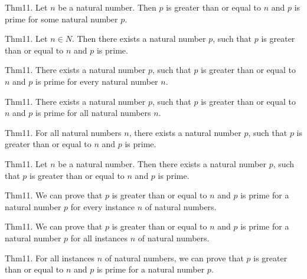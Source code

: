 \documentclass{article}
\begin{document}
Thm11. Let $n$ be a natural number. Then $p$ is greater than or equal to $n$ and $p$ is prime for some natural number $p$.

Thm11. Let $n \in N$. Then there exists a natural number $p$, such that $p$ is greater than or equal to $n$ and $p$ is prime.

Thm11. There exists a natural number $p$, such that $p$ is greater than or equal to $n$ and $p$ is prime for every natural number $n$.

Thm11. There exists a natural number $p$, such that $p$ is greater than or equal to $n$ and $p$ is prime for all natural numbers $n$.

Thm11. For all natural numbers $n$, there exists a natural number $p$, such that $p$ is greater than or equal to $n$ and $p$ is prime.

Thm11. Let $n$ be a natural number. Then there exists a natural number $p$, such that $p$ is greater than or equal to $n$ and $p$ is prime.

Thm11. We can prove that $p$ is greater than or equal to $n$ and $p$ is prime for a natural number $p$ for every instance $n$ of natural numbers.

Thm11. We can prove that $p$ is greater than or equal to $n$ and $p$ is prime for a natural number $p$ for all instances $n$ of natural numbers.

Thm11. For all instances $n$ of natural numbers, we can prove that $p$ is greater than or equal to $n$ and $p$ is prime for a natural number $p$.
\end{document}
